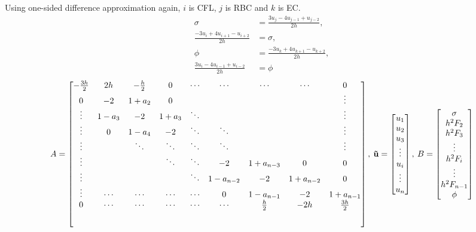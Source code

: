 \documentclass[8pt, a4paper]{article}
\begin{document}
  Using one-sided difference approximation again, $i$ is CFL, $j$ is RBC and 
  $k$ is EC.
  \begin{align*}
  \sigma&=\frac{3u_j-4u_{j-1}+u_{j-2}}{2h},\\
  \frac{-3u_i+4u_{i+1}-u_{i+2}}{2h}&=\sigma,\\
  \phi&=\frac{-3u_k+4u_{k+1}-u_{k+2}}{2h},\\
  \frac{3u_i-4u_{i-1}+u_{i-2}}{2h}&=\phi
  \end{align*}
  \begin{equation}
  A=
  \begin{bmatrix}
  -\frac{3h}{2} & 2h & -\frac{h}{2} & 0 & \cdots & \cdots & \cdots & \cdots & 
  0\\
  0 & -2 & 1+a_2 & 0 & & & & & \vdots\\
  \vdots & 1-a_3 & -2 & 1+a_3 & \ddots & & & & \vdots\\
  \vdots & 0 & 1-a_4 & -2 & \ddots & \ddots & &  & \vdots\\
  \vdots & & \ddots & \ddots & \ddots & \ddots & & & \vdots\\
  \vdots & & & \ddots & \ddots & -2 & 1+a_{n-3} & 0 & 0\\
  \vdots & & & & \ddots & 1-a_{n-2} & -2 & 1+a_{n-2} & 0\\
  \vdots & \cdots & \cdots & \cdots & \cdots & 0 & 1-a_{n-1} & -2 & 1+a_{n-1}\\
  0 & \cdots & \cdots & \cdots & \cdots & \cdots & \frac{h}{2} & -2h & 
  \frac{3h}{2}\\[5ex]
  \end{bmatrix},\:
  \mathbf{\vec{u}}=
  \begin{bmatrix}
  u_1\\
  u_2\\
  u_3\\
  \vdots\\
  u_i\\
  \vdots\\
  u_n
  \end{bmatrix},\:
  B=
  \begin{bmatrix}
  \sigma\\
  h^2F_2\\
  h^2F_3\\
  \vdots\\
  h^2F_i\\
  \vdots\\
  h^2F_{n-1}\\
  \phi
  \end{bmatrix}
  \end{equation}
  
\end{document}
